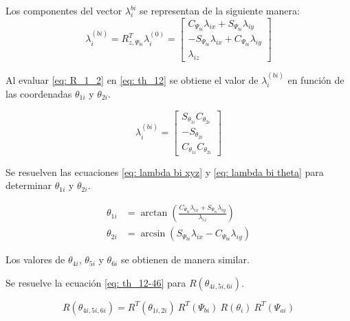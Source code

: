Los componentes del vector $\lambda_i^{bi}$ se representan 
de la siguiente manera:
\begin{equation}\label{eq: lambda bi xyz}
  \lambda_i^{(bi)} = R^T_{z,\Psi_{bi}} \lambda_i^{(0)} = \begin{bmatrix}
C_{\Psi_{bi}} \lambda_{ix} + S_{\Psi_{bi}} \lambda_{iy} \\
-S_{\Psi_{bi}} \lambda_{ix} + C_{\Psi_{bi}} \lambda_{iy} \\
\lambda_{iz}
\end{bmatrix}
\end{equation}

Al evaluar \eqref{eq: R_1_2} en \eqref{eq: th_12} se obtiene el valor
de $  \lambda_i^{(bi)}$ en función de las coordenadas
$\theta_{1i}$ y $\theta_{2i}$.

\begin{equation}\label{eq: lambda bi theta}
\lambda_i^{(bi)} = \begin{bmatrix}
                        S_{\theta_{1i}} C_{\theta_{2i}}\\
                        -S_{\theta_{2i}}\\
                        C_{\theta_{1i}} C_{\theta_{2i}}
                    \end{bmatrix}
\end{equation}

Se resuelven las ecuaciones \eqref{eq: lambda bi xyz} y 
\eqref{eq: lambda bi theta} para determinar $\theta_{1i}$ y $\theta_{2i}$.

\begin{subequations}
 \begin{align}
    \theta_{1i} &= \arctan \left(\frac{C_{\Psi_{bi}} \lambda_{ix} + S_{\Psi_{bi}} \lambda_{iy}}{\lambda_{iz}}\right)\\
    \theta_{2i} &= \arcsin \left(S_{\Psi_{bi}} \lambda_{ix} - C_{\Psi_{bi}} \lambda_{iy}\right)
 \end{align}
\end{subequations}

Los valores de 
$\theta_{4i}$, $\theta_{5i}$ y $\theta_{6i}$ 
se obtienen de manera similar.

Se resuelve la ecuación \eqref{eq: th_12-46} para 
$R(\theta_{4i,5i,6i})$.

\begin{equation}\label{eq: resp_456}
    R(\theta_{4i,5i,6i})= R^T(\theta_{1i,2i})\ R^T(\Psi_{bi})\ R(\theta_i)\ R^T(\Psi_{ai})
\end{equation}


